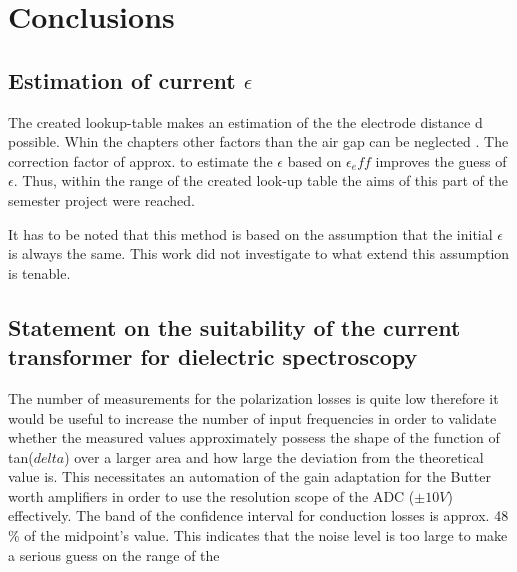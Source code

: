 \chapter{Conclusions}
\section{Estimation of current $\epsilon$}
The created lookup-table makes an estimation of the the electrode distance d possible.  Whin the chapters other factors than the air gap can be neglected . The correction factor of approx. to estimate the $\epsilon$ based on $\epsilon_eff$ improves the guess of $\epsilon$. Thus, within the range of the created look-up table the aims of this part of the semester project were reached. 

It has to be noted that this method is based on the assumption that the initial $\epsilon$ is always the same. This work did not investigate to what extend this assumption is tenable. 

\section{Statement on the suitability of the current transformer for dielectric spectroscopy}

The number of measurements for the polarization losses is quite low therefore it would be useful to increase the number of input frequencies in order to validate whether the measured values approximately possess the shape of the function of tan($delta$) over a larger area and how large the deviation from the theoretical value is. This necessitates an automation of the gain adaptation for the Butter worth amplifiers in order to use the resolution scope of the ADC ($\pm 10V$)  effectively. 
The band of the confidence interval for conduction losses is approx. 48 \% of the midpoint's value. This indicates that the noise level is too large to make a serious guess on the range of the 





